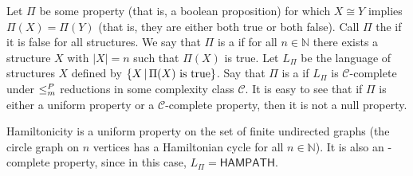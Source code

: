 Let $\Pi$ be some property (that is, a boolean proposition) for which $X\cong Y$ implies $\Pi(X)=\Pi(Y)$ (that is, they are either both true or both false).
Call $\Pi$ the  if it is false for all structures.
We say that $\Pi$ is a  if for all $n\in\mathbb{N}$ there exists a structure $X$ with $|X|=n$ such that $\Pi(X)$ is true.
Let $L_\Pi$ be the language of structures $X$ defined by $\left\{ X\,\middle|\,\Pi(X)\textnormal{ is true}\right\}$.
Say that $\Pi$ is a  if $L_\Pi$ is $\mathcal{C}$-complete under $\leq^{P}_{m}$ reductions in some complexity class $\mathcal{C}$.
It is easy to see that if $\Pi$ is either a uniform property or a $\mathcal{C}$-complete property, then it is not a null property.
\begin{example}
  Hamiltonicity is a uniform property on the set of finite undirected graphs (the circle graph on $n$ vertices has a Hamiltonian cycle for all $n\in\mathbb{N}$).
  It is also an \NP-complete property, since in this case, $L_\Pi=\mathsf{HAMPATH}$.
\end{example}

